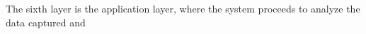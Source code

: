 

The sixth layer is the application layer, where the system proceeds to analyze the data captured and 




